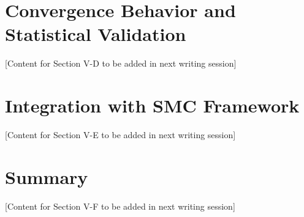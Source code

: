 \section{Convergence Behavior and Statistical Validation}
\label{sec:convergence_results}

[Content for Section V-D to be added in next writing session]


\section{Integration with SMC Framework}
\label{sec:smc_integration}

[Content for Section V-E to be added in next writing session]


\section{Summary}
\label{sec:chapter5_summary}

[Content for Section V-F to be added in next writing session]


